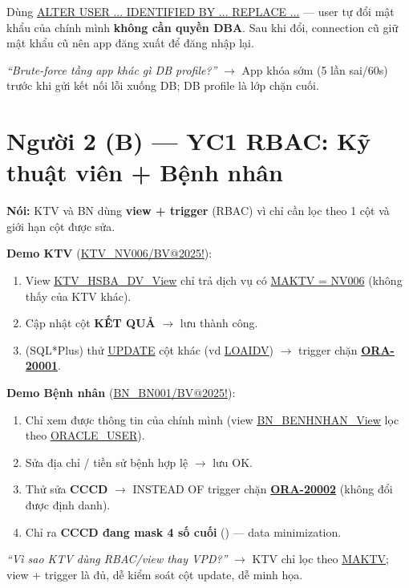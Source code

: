 \documentclass[12pt,a4paper]{article}
\DeclareRobustCommand{\code}[1]{\begingroup\urlstyle{tt}\url{#1}\endgroup}
\newcommand{\ra}{$\rightarrow$}
\begin{document}
\begin{notebox}[title={Nói khi demo đổi mật khẩu}]
Dùng \code{ALTER USER ... IDENTIFIED BY ... REPLACE ...} — user tự đổi mật khẩu của chính mình
\textbf{không cần quyền DBA}. Sau khi đổi, connection cũ giữ mật khẩu cũ nên app đăng xuất để đăng nhập lại.
\end{notebox}

\begin{warnbox}[title={Có thể bị hỏi}]
\textit{``Brute-force tầng app khác gì DB profile?''} \ra{} App khóa sớm (5 lần sai/60s) trước khi gửi
kết nối lỗi xuống DB; DB profile là lớp chặn cuối.
\end{warnbox}

\section{Người 2 (B) — YC1 RBAC: Kỹ thuật viên + Bệnh nhân}

\textbf{Nói:} KTV và BN dùng \textbf{view + trigger} (RBAC) vì chỉ cần lọc theo 1 cột và giới hạn cột được sửa.

\noindent\textbf{Demo KTV} (\code{KTV_NV006/BV@2025!}):
\begin{enumerate}
  \item View \code{KTV_HSBA_DV_View} chỉ trả dịch vụ có \code{MAKTV = NV006} (không thấy của KTV khác).
  \item Cập nhật cột \textbf{KẾT QUẢ} \ra{} lưu thành công.
  \item (SQL*Plus) thử \code{UPDATE} cột khác (vd \code{LOAIDV}) \ra{} trigger chặn \textbf{\code{ORA-20001}}.
\end{enumerate}

\noindent\textbf{Demo Bệnh nhân} (\code{BN_BN001/BV@2025!}):
\begin{enumerate}
  \item Chỉ xem được thông tin của chính mình (view \code{BN_BENHNHAN_View} lọc theo \code{ORACLE_USER}).
  \item Sửa địa chỉ / tiền sử bệnh hợp lệ \ra{} lưu OK.
  \item Thử sửa \textbf{CCCD} \ra{} INSTEAD OF trigger chặn \textbf{\code{ORA-20002}} (không đổi được định danh).
  \item Chỉ ra \textbf{CCCD đang mask 4 số cuối} (\texttt{\textbullet\textbullet\textbullet\textbullet\textbullet{}}) — data minimization.
\end{enumerate}

\begin{warnbox}[title={Có thể bị hỏi}]
\textit{``Vì sao KTV dùng RBAC/view thay VPD?''} \ra{} KTV chỉ lọc theo \code{MAKTV}; view + trigger là đủ,
dễ kiểm soát cột update, dễ minh họa.
\end{warnbox}
\end{document}
